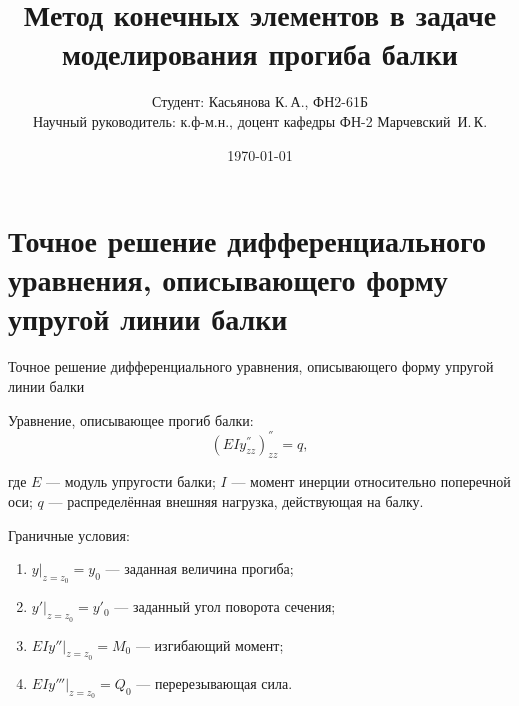 \documentclass[7pt]{beamer}
\title{Метод конечных элементов в задаче моделирования прогиба балки}
\author{Студент: Касьянова К.\,А., ФН2-61Б\\ \vspace*{5mm}
Научный руководитель: к.ф-м.н., доцент кафедры ФН-2 Марчевский~И.\,К.}
\date{\today}
\numberwithin{equation}{section}
\begin{document}

\begin{frame}[plain]
	\maketitle
\end{frame}

\section{Точное решение дифференциального уравнения, описывающего форму упругой линии балки}

\begin{frame}{Точное решение дифференциального уравнения, описывающего форму упругой линии балки} 
	\begin{block}{Уравнение, описывающее прогиб балки:}
	\[(EIy^{''}_{zz})^{''}_{zz}=q,\]
	\end{block}	
	где $E$ --- модуль упругости балки; $I$ --- момент инерции относительно поперечной оси; $q$ --- распределённая внешняя нагрузка, действующая на балку. \\
 
	\begin{block}{Граничные условия:}
		\begin{enumerate}
		\item $y|_{z=z_{0}}=y_{0}$ --- заданная величина прогиба;
		\item $y'|_{z=z_{0}}=y'_{0}$ --- заданный угол поворота сечения;
		\item $EIy''|_{z=z_{0}}=M_{0}$ --- изгибающий момент;
		\item $EIy'''|_{z=z_{0}}= Q_{0}$ --- перерезывающая сила.
		\end{enumerate}
	\end{block}	
\end{frame}
\end{document}
